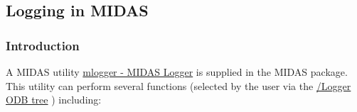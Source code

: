 \label{index_end}
\hypertarget{index_end}{}




\par
 \subsection{Logging in MIDAS}\label{F_Logging}
\label{F_Logging_idx_Logging}
\hypertarget{F_Logging_idx_Logging}{}
 

\par
 \hypertarget{F_Logging_F_Midas_Logger}{}\subsubsection{Introduction}\label{F_Logging_F_Midas_Logger}
A MIDAS utility \hyperlink{F_Logging_F_mlogger_utility}{mlogger -\/ MIDAS Logger} is supplied in the MIDAS package. This utility can perform several functions (selected by the user via the \hyperlink{F_Logging_Data_F_Logger_tree}{/Logger ODB tree} ) including:


